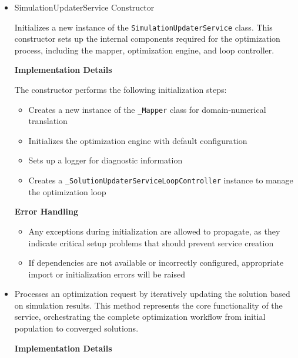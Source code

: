 \begin{itemize}
	\item SimulationUpdaterService Constructor
	
	Initializes a new instance of the \texttt{SimulationUpdaterService} class. This constructor sets up the internal components required for the optimization process, including the mapper, optimization engine, and loop controller.
	
	\textbf{Implementation Details}
	
	The constructor performs the following initialization steps:
	\begin{itemize}
		\item Creates a new instance of the \texttt{\_Mapper} class for domain-numerical translation
		\item Initializes the optimization engine with default configuration
		\item Sets up a logger for diagnostic information
		\item Creates a \texttt{\_SolutionUpdaterServiceLoopController} instance to manage the optimization loop
	\end{itemize}

	\textbf{Error Handling}
	\begin{itemize}
		\item Any exceptions during initialization are allowed to propagate, as they indicate critical setup problems that should prevent service creation
		\item If dependencies are not available or incorrectly configured, appropriate import or initialization errors will be raised
	\end{itemize}

	\item {}
	
	Processes an optimization request by iteratively updating the solution based on simulation results. This method represents the core functionality of the service, orchestrating the complete optimization workflow from initial population to converged solutions.
	
	\textbf{Implementation Details}
	

\end{itemize}
